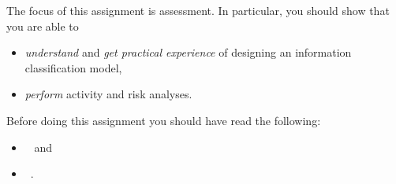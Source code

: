The focus of this assignment is assessment.
In particular, you should show that you are able to
\begin{itemize}
  \item \emph{understand} and \emph{get practical experience} of designing an 
    information classification model,
  \item \emph{perform} activity and risk analyses.
\end{itemize}

Before doing this assignment you should have read the following:
\begin{itemize}
  \item {}~\cite{MSB2011v} and
  \item {}~\cite{MSB2011r}.
\end{itemize}
